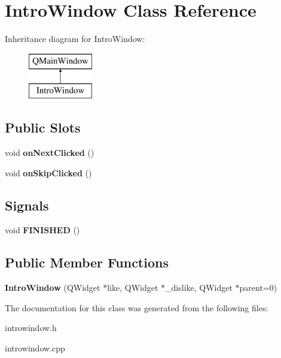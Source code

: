 \hypertarget{class_intro_window}{}\section{Intro\+Window Class Reference}
\label{class_intro_window}
Inheritance diagram for Intro\+Window\+:\begin{figure}[H]
\begin{center}
\leavevmode
\includegraphics[height=2.000000cm]{class_intro_window}
\end{center}
\end{figure}
\subsection*{Public Slots}
\begin{DoxyCompactItemize}
\item 
void {\bfseries on\+Next\+Clicked} ()\hypertarget{class_intro_window_ab8d051369152d97e08d9dd02635ab999}{}\label{class_intro_window_ab8d051369152d97e08d9dd02635ab999}

\item 
void {\bfseries on\+Skip\+Clicked} ()\hypertarget{class_intro_window_ada6c1a6322bb235d82a7228ffcdc14c0}{}\label{class_intro_window_ada6c1a6322bb235d82a7228ffcdc14c0}

\end{DoxyCompactItemize}
\subsection*{Signals}
\begin{DoxyCompactItemize}
\item 
void {\bfseries F\+I\+N\+I\+S\+H\+ED} ()\hypertarget{class_intro_window_ac7a08d8893736c443e49b80375983e0a}{}\label{class_intro_window_ac7a08d8893736c443e49b80375983e0a}

\end{DoxyCompactItemize}
\subsection*{Public Member Functions}
\begin{DoxyCompactItemize}
\item 
{\bfseries Intro\+Window} (Q\+Widget $\ast$like, Q\+Widget $\ast$\+\_\+dislike, Q\+Widget $\ast$parent=0)\hypertarget{class_intro_window_a20c9761c81730a9548bc3b3ad3d0f602}{}\label{class_intro_window_a20c9761c81730a9548bc3b3ad3d0f602}

\end{DoxyCompactItemize}


The documentation for this class was generated from the following files\+:\begin{DoxyCompactItemize}
\item 
introwindow.\+h\item 
introwindow.\+cpp\end{DoxyCompactItemize}
